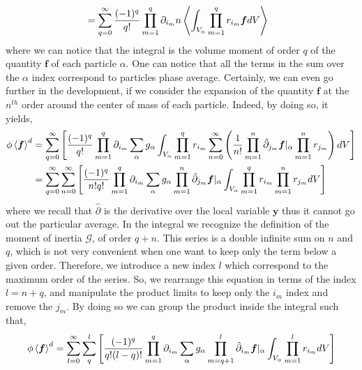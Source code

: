 {\begin{align}
    \label{eq:monoexp}
    &= \sum_{q=0}^\infty \frac{(-1)^q}{q!} \prod_{m=1}^{q} \partial_{i_m} 
        n \left<\int_{V_\alpha} \prod_{m=1}^{q} r_{i_m} \bm{f}  dV\right>
\end{align}
where we can notice that the integral is the volume moment of order $q$ of the quantity $\bm{f}$ of each particle $\alpha$.
One can notice that all the terms in the sum over the $\alpha$ index correspond to particles phase average.
Certainly, we can even go further in the development, if we consider the expansion of the quantity $\bm{f}$ at the $n^{th}$ order around the center of mass of each particle.
Indeed, by doing so, it yields,
\begin{align*}
    \phi\left<\bm{f}\right>^d &= \sum_{q=0}^\infty \left[\frac{(-1)^q}{q!} \prod_{m=1}^{q} \partial_{i_m} \sum_{\alpha} g_\alpha \int_{V_\alpha} \prod_{m=1}^{q} r_{i_m} \sum_{n=0}^\infty \left(
        \frac{1}{n!} \prod_{m=1}^{n} \hat{\partial}_{j_m}\bm{f}|_\alpha \prod_{m=1}^{n} r_{j_m}
    \right) dV\right]\\
    &= \sum_{q=0}^\infty \sum_{n=0}^\infty\left[\frac{(-1)^q}{n!q!} \prod_{m=1}^{q} \partial_{i_m} \sum_{\alpha} g_\alpha 
    \prod_{m=1}^{n} \hat{\partial}_{j_m}\bm{f}|_\alpha 
    \int_{V_\alpha} \prod_{m=1}^{q} r_{i_m}  
        \prod_{m=1}^{n} r_{j_m}
    dV\right] 
\end{align*}
where we recall that $\hat{\partial}$ is the derivative over the local variable $\bm{y}$ thus it cannot go out the particular average.  
In the integral we recognize the definition of the moment of inertia $\mathcal{G}$, of order $q+n$. 
This series is a double infinite sum on $n$ and $q$, which is not very convenient when one want to keep only the term below a given order. 
Therefore, we introduce a new index $l$ which correspond to the maximum order of the series. 
So, we rearrange this equation in terms of the index $l = n + q$, and manipulate the product limits to keep only the $i_m$ index and remove the $j_m$.
By doing so we can group the product inside the integral such that, 
\begin{equation*}
    \phi\left<\bm{f}\right>^d 
    = \sum_{l=0}^\infty \sum_{q}^l\left[\frac{(-1)^{q}}{q!(l-q)!} \partialp{1}{q} \sum_{\alpha} g_\alpha 
    \hatpartialpi{q+1}{l}\bm{f}|_\alpha 
    \int_{V_\alpha} 
        \pri{1}{l}  
    dV\right] 

\end{equation*}}
